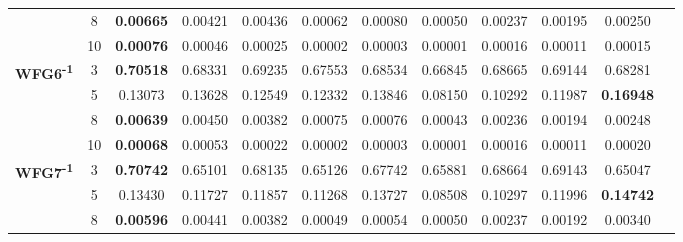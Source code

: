 \documentclass{sig-alternate}
\begin{document}
\begin{table*}[!htb]
\begin{tabular}{|c|c|c|c|c|c|c|c|c|c|c|c|}
                                                      & 8          & \textbf{0.00665}   & 0.00421            & 0.00436               & 0.00062          & 0.00080             & 0.00050             & 0.00237            & 0.00195              & 0.00250            \\ \cline{2-11} 
                                                      & 10         & \textbf{0.00076}   & 0.00046            & 0.00025               & 0.00002          & 0.00003             & 0.00001             & 0.00016            & 0.00011              & 0.00015            \\ \hline
\multirow{4}{*}{\textbf{WFG6\textsuperscript{-1}}}  & 3          & \textbf{0.70518}   & 0.68331            & 0.69235               & 0.67553          & 0.68534             & 0.66845             & 0.68665            & 0.69144              & 0.68281            \\ \cline{2-11} 
                                                      & 5          & 0.13073            & 0.13628            & 0.12549               & 0.12332          & 0.13846             & 0.08150             & 0.10292            & 0.11987              & \textbf{0.16948}   \\ \cline{2-11} 
                                                      & 8          & \textbf{0.00639}   & 0.00450            & 0.00382               & 0.00075          & 0.00076             & 0.00043             & 0.00236            & 0.00194              & 0.00248            \\ \cline{2-11} 
                                                      & 10         & \textbf{0.00068}   & 0.00053            & 0.00022               & 0.00002          & 0.00003             & 0.00001             & 0.00016            & 0.00011              & 0.00020            \\ \hline
\multirow{4}{*}{\textbf{WFG7\textsuperscript{-1}}}  & 3          & \textbf{0.70742}   & 0.65101            & 0.68135               & 0.65126          & 0.67742             & 0.65881             & 0.68664            & 0.69143              & 0.65047            \\ \cline{2-11} 
                                                      & 5          & 0.13430            & 0.11727            & 0.11857               & 0.11268          & 0.13727             & 0.08508             & 0.10297            & 0.11996              & \textbf{0.14742}   \\ \cline{2-11} 
                                                      & 8          & \textbf{0.00596}   & 0.00441            & 0.00382               & 0.00049          & 0.00054             & 0.00050             & 0.00237            & 0.00192              & 0.00340            \\ \cline{2-11} 

\end{tabular}
\end{table*}
\end{document}
